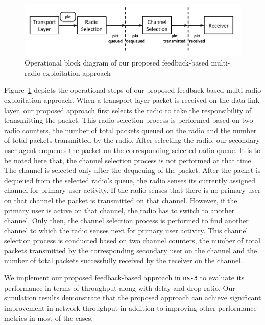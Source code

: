 \begin{figure}[!htbp]
    \begin{center}
        \includegraphics[width=1.0\textwidth]{myFigures/blockDiagram.png}
        \caption{Operational block diagram of our proposed feedback-based multi-radio exploitation approach}
        \label{fig:blockDiagram}
    \end{center}
\end{figure}

Figure~\ref{fig:blockDiagram} depicts the operational steps of our proposed feedback-based multi-radio exploitation approach. When a transport layer packet is received on the data link layer, our proposed approach first selects the radio to take the responsibility of transmitting the packet. This radio selection process is performed based on two radio counters, the number of total packets queued on the radio and the number of total packets transmitted by the radio. After selecting the radio, our secondary user agent enqueues the packet on the corresponding selected radio queue. It is to be noted here that, the channel selection process is not performed at that time. The channel is selected only after the dequeuing of the packet. After the packet is dequeued from the selected radio's queue, the radio senses its currently assigned channel for primary user activity. If the radio senses that there is no primary user on that channel the packet is transmitted on that channel. However, if the primary user is active on that channel, the radio has to switch to another channel. Only then, the channel selection process is performed to find another channel to which the radio senses next for primary user activity. This channel selection process is conducted based on two channel counters, the number of total packets transmitted by the corresponding secondary user on the channel and the number of total packets successfully received by the receiver on the channel.

We implement our proposed feedback-based approach in \texttt{ns-3} to evaluate its performance in terms of throughput along with delay and drop ratio. Our simulation results demonstrate that the proposed approach can achieve significant improvement in network throughput in addition to improving other performance metrics in most of the cases.

